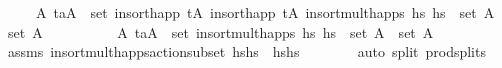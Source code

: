 \begin{isabellebody}
\ \ \ \ \ {\isachardoublequoteopen}{\isasymexists}A{\isacharprime}{\kern0pt}{\isachardot}{\kern0pt}\ {\isacharparenleft}{\kern0pt}t\isactrlsub a{\isacharcomma}{\kern0pt}A{\isacharprime}{\kern0pt}{\isacharparenright}{\kern0pt}\ {\isasymin}\ set\ {\isacharparenleft}{\kern0pt}insort{\isacharunderscore}{\kern0pt}happ\ {\isacharparenleft}{\kern0pt}tA\ {\isacharparenleft}{\kern0pt}insort{\isacharunderscore}{\kern0pt}happ\ {\isacharparenleft}{\kern0pt}tA\ {\isacharparenleft}{\kern0pt}insort{\isacharunderscore}{\kern0pt}mult{\isacharunderscore}{\kern0pt}happs\ hs\ hs\ {\isasymand}\ set\ A\ {\isasymsubseteq}\ set\ A{\isacharprime}{\kern0pt}{\isachardoublequoteclose}\isanewline
%
\isadelimproof
\ \ %
\endisadelimproof
%
\isatagproof
{}\isamarkupfalse%
\ {\isacharminus}{\kern0pt}\isanewline
\ \ \ \ \isamarkupfalse%
\ {\isachardoublequoteopen}{\isasymexists}A{\isacharprime}{\kern0pt}{\isachardot}{\kern0pt}\ {\isacharparenleft}{\kern0pt}t\isactrlsub a{\isacharcomma}{\kern0pt}A{\isacharprime}{\kern0pt}{\isacharparenright}{\kern0pt}\ {\isasymin}\ set\ {\isacharparenleft}{\kern0pt}insort{\isacharunderscore}{\kern0pt}mult{\isacharunderscore}{\kern0pt}happs\ hs\ hs\ {\isasymand}\ set\ A\ {\isasymsubseteq}\ set\ A{\isacharprime}{\kern0pt}{\isachardoublequoteclose}\isanewline
\ \ \ \ \ \ \isamarkupfalse%
\ assms\ insort{\isacharunderscore}{\kern0pt}mult{\isacharunderscore}{\kern0pt}happs{\isacharunderscore}{\kern0pt}action{\isacharunderscore}{\kern0pt}subset{\isacharbrackleft}{\kern0pt}\ hshs\ \ hshs\isanewline
\ \ \ \ \ \ \isamarkupfalse%
\ {\isacharparenleft}{\kern0pt}auto\ split{\isacharcolon}{\kern0pt}\ prod{\isachardot}{\kern0pt}splits{\isacharparenright}{\kern0pt}\isanewline
\ \ \ \ \isamarkupfalse%
\ \isamarkupfalse%

\end{isabellebody}
